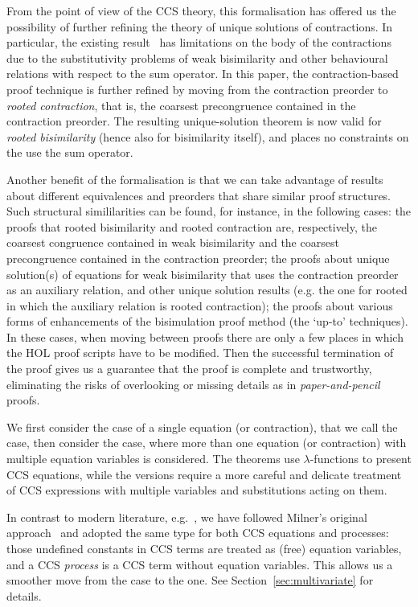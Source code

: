 From the point of view of the CCS theory, this formalisation has offered us the possibility of
further refining the theory of unique solutions of contractions.
In particular, the existing result~\cite{sangiorgi2017equations} has limitations on the body of the contractions due to the
substitutivity problems of weak bisimilarity and other behavioural relations with respect
to the sum operator.
In this paper, the contraction-based proof technique is further
refined by moving from the contraction preorder to
\emph{rooted contraction}, that is, the coarsest precongruence contained in the contraction
preorder. The resulting unique-solution theorem is now valid for
\emph{rooted bisimilarity} (hence also for bisimilarity itself), and places no 
constraints on the use the sum operator.

Another benefit of the formalisation is 
that we can take advantage of results about different 
equivalences and preorders that share similar proof structures.
Such structural simililarities can be found, for instance, in the
following cases: the proofs that rooted bisimilarity and rooted
contraction are, respectively, the coarsest congruence contained in
weak bisimilarity and the coarsest precongruence contained in the
contraction preorder; the proofs about unique solution(s) of equations
for weak bisimilarity that uses the contraction preorder as an
auxiliary relation, and other unique solution results (e.g. the one
for rooted in which the auxiliary relation is rooted contraction); the
proofs about various forms of enhancements of the bisimulation proof
method (the `up-to' techniques).
%
In these cases, when moving between proofs there are only a few places in
which the HOL proof scripts have to be modified.
Then the successful termination of the proof gives us a guarantee that the proof is
complete and trustworthy, eliminating the risks 
of overlooking or missing details as in \emph{paper-and-pencil} proofs.

We first consider the case of a single equation (or contraction),
that we call the \univariate case, then consider the \multivariate
  case, where  more than one equation
  (or contraction) with multiple equation variables is considered.
The \univariate theorems use
$\lambda$-functions to present CCS equations,
while the \multivariate versions require a
more careful and delicate treatment of CCS
expressions with multiple variables and substitutions acting on them.

In contrast to modern literature, e.g.~\cite{Gorrieri:2015jt},
we have followed Milner's original approach~\cite{milner1990operational} and adopted the same
type for both CCS equations and processes: those undefined constants
in CCS terms are treated as  (free) equation variables, and a CCS
\emph{process} is a CCS term without equation variables. 
This allows us a smoother move from the \univariate case to the \multivariate
one. See Section~\ref{sec:multivariate} for  details.

